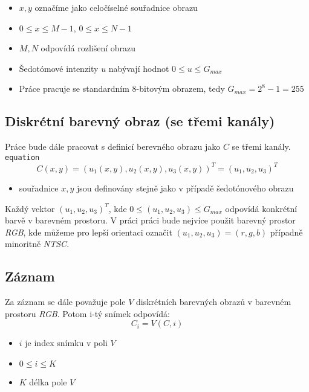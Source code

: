 \documentclass[
  digital, %
  table,   %
%
  lof,     %
  lot,     %
]{fithesis3}
\begin{document}
\begin {itemize}
    \item $x,y$ označíme jako celočíselné souřadnice obrazu
    \item $0 \leq x \leq M-1$, $0 \leq x \leq N-1$
    \item $M, N$ odpovídá rozlišení obrazu
	\item Šedotómové intenzity $u$ nabývají hodnot $0 \leq u \leq G_{max}$
    \item Práce pracuje se standardním 8-bitovým obrazem, tedy  $G_{max} = 2^8 - 1 = 255$
\end {itemize}

\subsection {Diskrétní barevný obraz (se třemi kanály)}
    Práce bude dále pracovat s definicí berevného obrazu jako  $C$ se třemi kanály.
\texttt{equation}
\begin{equation}
	C(x,y) = (u_1(x,y), u_2(x,y), u_3(x,y))^T = (u_1, u_2, u_3)^T
\end{equation}
\begin{itemize}
    \item souřadnice $x,y$ jsou definovány stejně jako v případě šedotónového obrazu
\end{itemize}
	Každý vektor $(u_1, u_2, u_3)^T$, kde $0 \leq (u_1, u_2, u_3) \leq G_{max} $ odpovídá konkrétní barvě v barevném prostoru. V práci práci bude nejvíce použit barevný prostor \emph{RGB}, kde můžeme pro lepší orientaci označit $(u_1, u_2, u_3) = (r,g,b)$ případně minoritně \emph{NTSC}.

\subsection{Záznam}
Za záznam se dále považuje pole $V$ diskrétních barevných obrazů v barevném prostoru \emph{RGB}. Potom i-tý snímek odpovídá:
\begin{equation}
	C_i = V(C,i)
\end{equation}
\begin{itemize}
	\item $i$ je index snímku v poli $V$
    \item $0 \leq i \leq K$
    \item $K$ délka pole $V$
\end{itemize}
\end{document}
